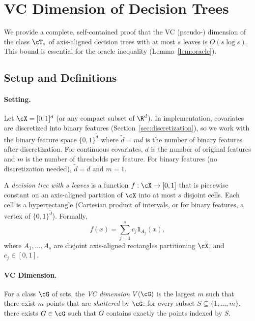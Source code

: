 
\section{VC Dimension of Decision Trees}
\label{app:vc-dimension}

We provide a complete, self-contained proof that the VC (pseudo-) dimension of the class $\cT_s$ of axis-aligned decision trees with at most $s$ leaves is $O(s \log s)$. This bound is essential for the oracle inequality (Lemma~\ref{lem:oracle}).

\subsection{Setup and Definitions}

\paragraph{Setting.}
Let $\cX = [0,1]^d$ (or any compact subset of $\R^d$). In implementation, covariates are discretized into binary features (Section~\ref{sec:discretization}), so we work with the binary feature space $\{0,1\}^{\tilde{d}}$ where $\tilde{d} = md$ is the number of binary features after discretization. For continuous covariates, $d$ is the number of original features and $m$ is the number of thresholds per feature. For binary features (no discretization needed), $\tilde{d} = d$ and $m = 1$.

A \emph{decision tree with $s$ leaves} is a function $f: \cX \to [0,1]$ that is piecewise constant on an axis-aligned partition of $\cX$ into at most $s$ disjoint cells. Each cell is a hyperrectangle (Cartesian product of intervals, or for binary features, a vertex of $\{0,1\}^{\tilde{d}}$). Formally,
\[
f(x) = \sum_{j=1}^s c_j \mathbf{1}_{A_j}(x),
\]
where $A_1, \ldots, A_s$ are disjoint axis-aligned rectangles partitioning $\cX$, and $c_j \in [0,1]$.

\paragraph{VC Dimension.}
For a class $\cG$ of sets, the \emph{VC dimension} $V(\cG)$ is the largest $m$ such that there exist $m$ points that are \emph{shattered} by $\cG$: for every subset $S \subseteq \{1,\ldots,m\}$, there exists $G \in \cG$ such that $G$ contains exactly the points indexed by $S$.

